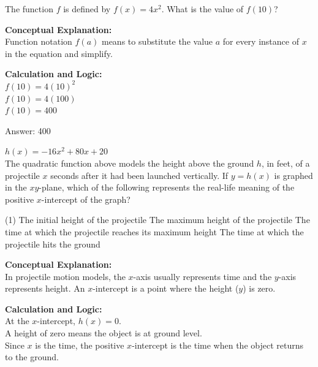 \documentclass[11pt,paper=a4,answers]{exam}
\begin{document}
\begin{questions}
\vspace{40pt}

\question
The function $f$ is defined by $f(x) = 4x^2$. What is the value of $f(10)$?

\begin{solution}
\textbf{Conceptual Explanation:} \\
Function notation $f(a)$ means to substitute the value $a$ for every instance of $x$ in the equation and simplify.

\vspace{20pt}

\textbf{Calculation and Logic:} \\
$f(10) = 4(10)^2$ \\
$f(10) = 4(100)$ \\
$f(10) = 400$

\vspace{25pt}

Answer: \colorbox{yellow!100}{400}
\end{solution}

\vspace{40pt}

\question
$h(x) = -16x^2 + 80x + 20$ \\
The quadratic function above models the height above the ground $h$, in feet, of a projectile $x$ seconds after it had been launched vertically. If $y = h(x)$ is graphed in the $xy$-plane, which of the following represents the real-life meaning of the positive $x$-intercept of the graph?
\begin{tasks}(1)
    \task The initial height of the projectile
    \task The maximum height of the projectile
    \task The time at which the projectile reaches its maximum height
    \task The time at which the projectile hits the ground
\end{tasks}

\begin{solution}
\textbf{Conceptual Explanation:} \\
In projectile motion models, the $x$-axis usually represents time and the $y$-axis represents height. An $x$-intercept is a point where the height ($y$) is zero.

\vspace{20pt}

\textbf{Calculation and Logic:} \\
At the $x$-intercept, $h(x) = 0$. \\
A height of zero means the object is at ground level. \\
Since $x$ is the time, the positive $x$-intercept is the time when the object returns to the ground.


\end{solution}
\end{questions}
\end{document}
